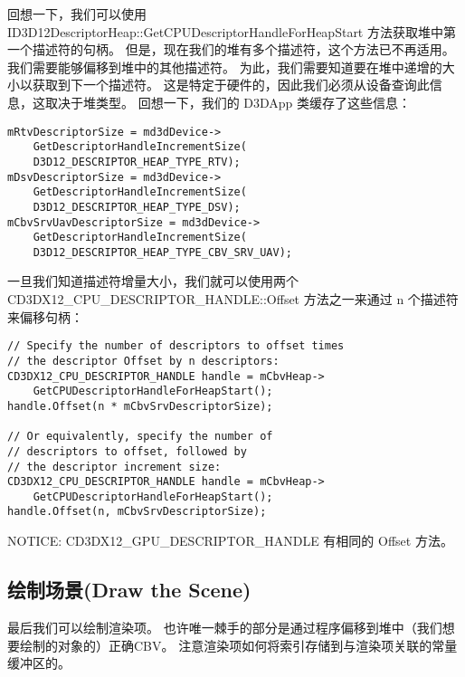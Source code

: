 \begin{flushleft}
回想一下，我们可以使用 ID3D12DescriptorHeap::GetCPUDescriptorHandleForHeapStart 方法获取堆中第一个描述符的句柄。 但是，现在我们的堆有多个描述符，这个方法已不再适用。 我们需要能够偏移到堆中的其他描述符。 为此，我们需要知道要在堆中递增的大小以获取到下一个描述符。 这是特定于硬件的，因此我们必须从设备查询此信息，这取决于堆类型。 回想一下，我们的 D3DApp 类缓存了这些信息：\\
\end{flushleft}

\begin{lstlisting}
mRtvDescriptorSize = md3dDevice->
    GetDescriptorHandleIncrementSize(
    D3D12_DESCRIPTOR_HEAP_TYPE_RTV);
mDsvDescriptorSize = md3dDevice->
    GetDescriptorHandleIncrementSize(
    D3D12_DESCRIPTOR_HEAP_TYPE_DSV);
mCbvSrvUavDescriptorSize = md3dDevice->
    GetDescriptorHandleIncrementSize(
    D3D12_DESCRIPTOR_HEAP_TYPE_CBV_SRV_UAV);
\end{lstlisting}

\begin{flushleft}
一旦我们知道描述符增量大小，我们就可以使用两个 CD3DX12\_CPU\_DESCRIPTOR\_HANDLE::Offset 方法之一来通过 n 个描述符来偏移句柄：\\
\end{flushleft}

\begin{lstlisting}
// Specify the number of descriptors to offset times 
// the descriptor Offset by n descriptors:
CD3DX12_CPU_DESCRIPTOR_HANDLE handle = mCbvHeap->
    GetCPUDescriptorHandleForHeapStart();
handle.Offset(n * mCbvSrvDescriptorSize);

// Or equivalently, specify the number of 
// descriptors to offset, followed by 
// the descriptor increment size:
CD3DX12_CPU_DESCRIPTOR_HANDLE handle = mCbvHeap->
    GetCPUDescriptorHandleForHeapStart();
handle.Offset(n, mCbvSrvDescriptorSize);
\end{lstlisting}

\begin{flushleft}
NOTICE: CD3DX12\_GPU\_DESCRIPTOR\_HANDLE 有相同的 Offset 方法。
\end{flushleft}


\subsection{绘制场景(Draw the Scene)}
\begin{flushleft}
最后我们可以绘制渲染项。 也许唯一棘手的部分是通过程序偏移到堆中（我们想要绘制的对象的）正确CBV。 注意渲染项如何将索引存储到与渲染项关联的常量缓冲区的。\\
\end{flushleft}

